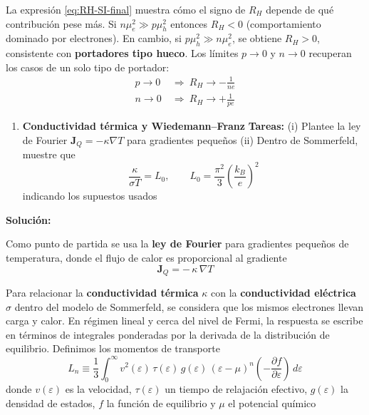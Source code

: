 \documentclass{article}
\newenvironment{AGbox}[1][7]%
{%
  \begin{tcolorbox}[
    enhanced, breakable,
    colframe=AppleGreen,
    colback=AppleGreen!#1,
    boxrule=1pt,
    borderline west={2mm}{-10mm}{AppleGreen},
    sharp corners=southwest,
    left=14pt,right=14pt,top=10pt,bottom=10pt,
     boxsep=6pt,
  ]%
}{%
  \end{tcolorbox}%
}
\begin{document}
La expresión \eqref{eq:RH-SI-final} muestra cómo el signo de $R_H$ depende de qué contribución pese más. Si $n\mu_e^{2}\gg p\mu_h^{2}$ entonces $R_H<0$ (comportamiento dominado por electrones). En cambio, si $p\mu_h^{2}\gg n\mu_e^{2}$, se obtiene $R_H>0$, consistente con \textcolor{Cerulean}{\textbf{portadores tipo hueco}}. Los límites $p\to 0$ y $n\to 0$ recuperan los casos de un solo tipo de portador:
\begin{equation}\label{eq:limites}
\begin{aligned}
p\to 0 &\ \Rightarrow\ R_H\to -\frac{1}{ne}\\
n\to 0 &\ \Rightarrow\ R_H\to +\frac{1}{pe}
\end{aligned}
\end{equation}


\begin{AGbox}[8]
\begin{enumerate}[label={{\textcolor{trueblue}{\textbf{Pr.} \arabic*.3}}}, start=3]
  \item \textcolor{Cerulean}{\textbf{Conductividad térmica y Wiedemann–Franz}}
  \textbf{Tareas:}
  (i) Plantee la ley de Fourier $\mathbf J_Q=-\kappa\nabla T$ para gradientes pequeños
  (ii) Dentro de Sommerfeld, muestre que
  \begin{equation}\label{eq:WF}
    \frac{\kappa}{\sigma T}=L_0,\qquad L_0=\frac{\pi^2}{3}\left(\frac{k_B}{e}\right)^2
  \end{equation}
  indicando los supuestos usados
\end{enumerate}
\end{AGbox}

\vspace{0.5cm}\textcolor{Cinnabar}{\textbf{Solución:}}


Como punto de partida se usa la \textcolor{Cerulean}{\textbf{ley de Fourier}} para gradientes pequeños de temperatura, donde el flujo de calor es proporcional al gradiente
\begin{equation}\label{eq:fourier}
\mathbf J_Q=-\,\kappa\,\nabla T
\end{equation}

Para relacionar la \textcolor{Cerulean}{\textbf{conductividad térmica}} $\kappa$ con la \textcolor{Cerulean}{\textbf{conductividad eléctrica}} $\sigma$ dentro del modelo de Sommerfeld, se considera que los mismos electrones llevan carga y calor. En régimen lineal y cerca del nivel de Fermi, la respuesta se escribe en términos de integrales ponderadas por la derivada de la distribución de equilibrio. Definimos los momentos de transporte
\begin{equation}\label{eq:Ln}
L_n \equiv \frac{1}{3}\int_{0}^{\infty} v^2(\varepsilon)\,\tau(\varepsilon)\,g(\varepsilon)\,(\varepsilon-\mu)^{n}\left(-\frac{\partial f}{\partial \varepsilon}\right)\,d\varepsilon
\end{equation}
donde $v(\varepsilon)$ es la velocidad, $\tau(\varepsilon)$ un tiempo de relajación efectivo, $g(\varepsilon)$ la densidad de estados, $f$ la función de equilibrio y $\mu$ el potencial químico
\end{document}
